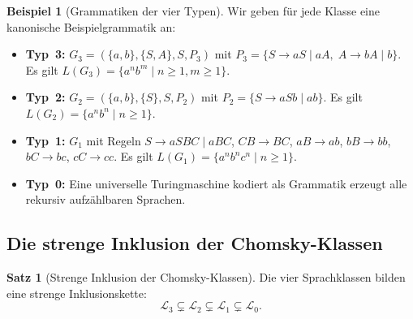 ﻿\documentclass[a4paper,12pt]{article}
\theoremstyle{definition}
\newtheorem{beispiel}{Beispiel}
\newtheorem{satz}{Satz}
\begin{document}
\begin{beispiel}[Grammatiken der vier Typen]
\label{bsp:vier_typen}
Wir geben f\"ur jede Klasse eine kanonische Beispielgrammatik an:
\begin{itemize}
    \item \textbf{Typ~3:} $G_3 = (\{a,b\}, \{S,A\}, S, P_3)$ mit
          $P_3 = \{S \to aS \mid aA,\; A \to bA \mid b\}$.
          Es gilt $L(G_3) = \{a^n b^m \mid n \geq 1, m \geq 1\}$.
    \item \textbf{Typ~2:} $G_2 = (\{a,b\}, \{S\}, S, P_2)$ mit
          $P_2 = \{S \to aSb \mid ab\}$.
          Es gilt $L(G_2) = \{a^n b^n \mid n \geq 1\}$.
    \item \textbf{Typ~1:} $G_1$ mit Regeln
          $S \to aSBC \mid aBC$, $CB \to BC$, $aB \to ab$, $bB \to bb$,
          $bC \to bc$, $cC \to cc$.
          Es gilt $L(G_1) = \{a^n b^n c^n \mid n \geq 1\}$.
    \item \textbf{Typ~0:} Eine universelle Turingmaschine kodiert als
          Grammatik erzeugt alle rekursiv aufz\"ahlbaren Sprachen.
\end{itemize}
\end{beispiel}

\subsection{Die strenge Inklusion der Chomsky-Klassen}

\begin{satz}[Strenge Inklusion der Chomsky-Klassen]
\label{satz:inklusion}
Die vier Sprachklassen bilden eine strenge Inklusionskette:
\[
\mathcal{L}_3 \subsetneq \mathcal{L}_2 \subsetneq \mathcal{L}_1
\subsetneq \mathcal{L}_0.
\]
\end{satz}
\end{document}
